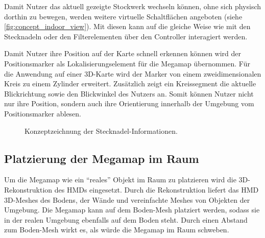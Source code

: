 Damit Nutzer das aktuell gezeigte Stockwerk wechseln können, ohne sich physisch dorthin zu bewegen, werden weitere virtuelle Schaltflächen angeboten (siehe \autoref{fig:concept_indoor_view}).
Mit diesen kann auf die gleiche Weise wie mit den Stecknadeln oder den Filterelementen über den Controller interagiert werden.

Damit Nutzer ihre Position auf der Karte schnell erkennen können wird der Positionsmarker als Lokalisierungselement für die Megamap übernommen.
Für die Anwendung auf einer 3D-Karte wird der Marker von einem zweidimensionalen Kreis zu einem Zylinder erweitert.
Zusätzlich zeigt ein Kreissegment die aktuelle Blickrichtung sowie den Blickwinkel des Nutzers an.
Somit können Nutzer nicht nur ihre Position, sondern auch ihre Orientierung innerhalb der Umgebung vom Positionsmarker ablesen.

\begin{figure}[bth]
	\centering
	\caption{Konzeptzeichnung der Stecknadel-Informationen.}
	\label{fig:concept_pin_info}
\end{figure}

\subsection{Platzierung der Megamap im Raum}
Um die Megamap wie ein \enquote{reales} Objekt im Raum zu platzieren wird die 3D-Rekonstruktion des HMDs eingesetzt.
Durch die Rekonstruktion liefert das HMD 3D-Meshes des Bodens, der Wände und vereinfachte Meshes von Objekten der Umgebung.
Die Megamap kann auf dem Boden-Mesh platziert werden, sodass sie in der realen Umgebung ebenfalls auf dem Boden steht.
Durch einen Abstand zum Boden-Mesh wirkt es, als würde die Megamap im Raum schweben.


